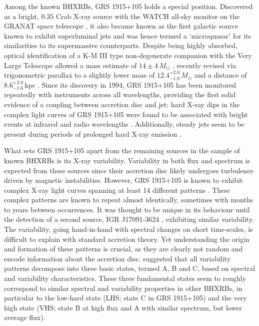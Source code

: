 \documentclass[12pt]{emulateapj}
\begin{document}
Among the known BHXRBs, GRS 1915+105 holds a special position. Discovered as a bright, $0.35$ Crab X-ray source \citep{castrotirado1994} with the WATCH all-sky monitor on the GRANAT space telescope \citep{castrotirado1992}, it also became known as the first galactic source known to exhibit superluminal jets \citep{mirabel1994, fender1999} and was hence termed a `microquasar' for its similarities to its supermassive counterparts. 
Despite being highly absorbed, optical identification of a K-M III type non-degenerate companion with the Very Large Telescope allowed a mass estimate of $14\pm 4\,M_\odot$ \citep{greiner2001}, recently revised via trigonometric parallax to a slightly lower mass of $12.4^{+2.0}_{-1.8}\, M_\odot$ and a distance of $8.6^{+2.0}_{-1.6}\,\mathrm{kpc}$ \citep{reid2014}. 
Since its discovery in 1994, GRS 1915+105 has been monitored repeatedly with instruments across all wavelengths, providing the first solid evidence of a coupling between accretion disc and jet: hard X-ray dips in the complex light curves of GRS 1915+105 were found to be associated with bright events at infrared and radio wavelengths \citep{pooley1997, eikenberry1998a, eikenberry1998b, kleinwolt2002}. Additionally, steady jets seem to be present during periods of prolonged hard X-ray emission \citep{foster1996, dhawan2000, fuchs2003}. 

What sets GRS 1915+105 apart from the remaining sources in the sample of known BHXRBs is its X-ray variability. Variability in both flux and spectrum is expected from these sources since their accretion disc likely undergoes turbulence driven by magnetic instabilities. However, GRS 1915+105 is known to exhibit complex X-ray light curves spanning at least 14 different patterns \citep{belloni2000, kleinwolt2002, hannikainen2003, hannikainen2005}. These complex patterns are known to repeat almost identically, sometimes with months to years between occurrences. It was thought to be unique in its behaviour until the detection of a second source, IGR J17091-3624 \citep{altamirano2011}, exhibiting similar variability. 
The variability, going hand-in-hand with spectral changes on short time-scales, is difficult to explain with standard accretion theory. Yet understanding the origin and formation of these patterns is crucial, as they are clearly not random and encode information about the accretion disc. \citet{belloni1997a, belloni1997b, belloni2000} suggested that all variability patterns decompose into three basic states, termed A, B and C, based on spectral and variability characteristics. These three fundamental states seem to roughly correspond to similar spectral and variability properties in other BHXRBs, in particular to the low-hard state (LHS; state C in GRS 1915+105) and the very high state (VHS; state B at high flux and A with similar spectrum, but lower average flux).
\end{document}

